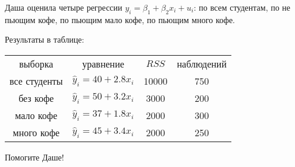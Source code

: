 \documentclass[12pt]{article} %
\theoremstyle{definition} %
\begin{document}
\begin{enumerate}
Даша оценила четыре регрессии $y_i = \beta_1 + \beta_2 x_i + u_i$: по всем студентам, по не пьющим кофе, 
по пьющим мало кофе, по пьющим много кофе.

Результаты в таблице:

\begin{tabular}{cccc}
	\toprule
	выборка & уравнение & $RSS$ & наблюдений \\
	все студенты & $\hat y_i = 40 + 2.8x_i$ & 10000 & 750 \\
	без кофе & $\hat y_i = 50 + 3.2x_i$ & 3000 & 200 \\
	мало кофе & $\hat y_i = 37 + 1.8x_i$ & 2000 & 300 \\
    много кофе & $\hat y_i = 45 + 3.4x_i$ & 2000 & 250 \\
    \bottomrule
\end{tabular}


Помогите Даше!


\end{enumerate}
\end{document}
